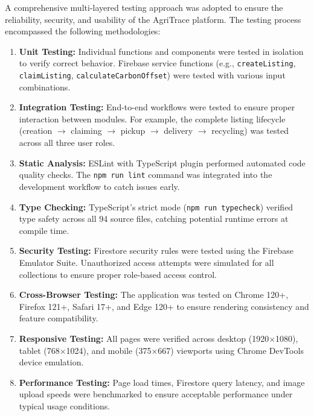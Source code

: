\documentclass[a4paper,12pt,oneside]{report}
\let\originalitem\item
\renewcommand{\item}{\Needspace{10\baselineskip}\originalitem}
\begin{document}
\noindent A comprehensive multi-layered testing approach was adopted to ensure the reliability, security, and usability of the AgriTrace platform. The testing process encompassed the following methodologies:

\begin{enumerate}
    \item \textbf{Unit Testing:} Individual functions and components were tested in isolation to verify correct behavior. Firebase service functions (e.g., \texttt{createListing}, \texttt{claimListing}, \texttt{calculateCarbonOffset}) were tested with various input combinations.

    \item \textbf{Integration Testing:} End-to-end workflows were tested to ensure proper interaction between modules. For example, the complete listing lifecycle (creation $\rightarrow$ claiming $\rightarrow$ pickup $\rightarrow$ delivery $\rightarrow$ recycling) was tested across all three user roles.

    \item \textbf{Static Analysis:} ESLint with TypeScript plugin performed automated code quality checks. The \texttt{npm run lint} command was integrated into the development workflow to catch issues early.

    \item \textbf{Type Checking:} TypeScript's strict mode (\texttt{npm run typecheck}) verified type safety across all 94 source files, catching potential runtime errors at compile time.

    \item \textbf{Security Testing:} Firestore security rules were tested using the Firebase Emulator Suite. Unauthorized access attempts were simulated for all collections to ensure proper role-based access control.

    \item \textbf{Cross-Browser Testing:} The application was tested on Chrome 120+, Firefox 121+, Safari 17+, and Edge 120+ to ensure rendering consistency and feature compatibility.

    \item \textbf{Responsive Testing:} All pages were verified across desktop (1920$\times$1080), tablet (768$\times$1024), and mobile (375$\times$667) viewports using Chrome DevTools device emulation.

    \item \textbf{Performance Testing:} Page load times, Firestore query latency, and image upload speeds were benchmarked to ensure acceptable performance under typical usage conditions.
\end{enumerate}
\end{document}
